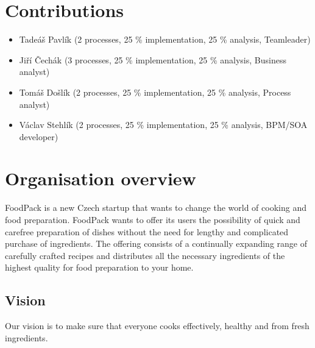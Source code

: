 \documentclass[11pt,a4paper]{article}
\begin{document}
\setlength{\parskip}{0pt}
    \hypersetup{hidelinks}\tableofcontents
\setlength{\parskip}{0pt}

\newpage


\section{Contributions}

\begin{itemize}
    \item Tadeáš Pavlík (2 processes, 25 \% implementation, 25 \% analysis, Teamleader)
    \item Jiří Čechák (3 processes, 25 \% implementation, 25 \% analysis, Business analyst)
    \item Tomáš Došlík (2 processes, 25 \% implementation, 25 \% analysis, Process analyst)
    \item Václav Stehlík (2 processes, 25 \% implementation, 25 \% analysis, BPM/SOA developer)
\end{itemize}


\section{Organisation overview}

FoodPack is a new Czech startup that wants to change the world of cooking and food preparation. FoodPack wants to offer its users the possibility of quick and carefree preparation of dishes without the need for lengthy and complicated purchase of ingredients. The offering consists of a continually expanding range of carefully crafted recipes and distributes all the necessary ingredients of the highest quality for food preparation to your home.


\subsection{Vision}

Our vision is to make sure that everyone cooks effectively, healthy and from fresh ingredients.

\end{document}
